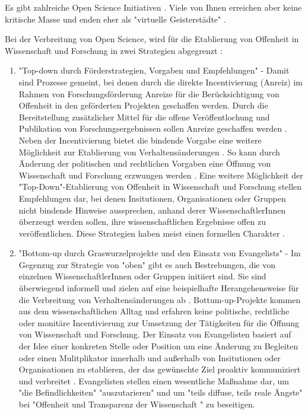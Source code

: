Es gibt zahlreiche Open Science Initiativen \cite{Scheliga_2014}. Viele von Ihnen erreichen aber keine kritische Masse \cite{wrap_2010} und enden eher als "virtuelle Geisterstädte" \cite{Nielsen_2011}.

Bei der Verbreitung von Open Science, wird für die Etablierung von Offenheit in Wissenschaft und Forschung in zwei Strategien abgegrenzt \cite{schulze_2013_open}: 
\begin{enumerate}
\item "Top-down durch Förderstrategien, Vorgaben und Empfehlungen" - 
Damit sind Prozesse gemeint, bei denen durch die direkte Incentivierung (Anreiz) im Rahmen von Forschungsförderung Anreize für die Berücksichtigung von Offenheit in den geförderten Projekten geschaffen werden. Durch die Bereitstellung zusätzlicher Mittel für die offene Veröffentlochung und Publikation von Forschungsergebnissen sollen Anreize geschaffen werden \cite{suchen}. Neben der Incentivierung bietet die bindende Vorgabe eine weitere Möglichkeit zur Etablierung von Verhaltensänderungen \cite{suchen}. So kann durch Änderung der politischen und rechtlichen Vorgaben eine Öffnung von Wissenschaft und Forschung erzwungen werden \cite{suchen}. Eine weitere Möglichkeit der "Top-Down"-Etablierung von Offenheit in Wissenschaft und Forschung stellen Empfehlungen dar, bei denen Insitutionen, Organisationen oder Gruppen nicht bindende Hinweise aussprechen, anhand derer WissenschaftlerInnen überzeugt werden sollen, ihre wissenschaftlichen Ergebnisse offen zu veröffentlichen. Diese Strategien haben meist einen formellen Charakter \cite{suchen}.
\item "Bottom-up durch Graswurzelprojekte und den Einsatz von Evangelists" - 
Im Gegenzug zur Strategie von "oben" gibt es auch Bestrebungen, die von einzelnen WissenschaftlerInnen oder Gruppen initiiert sind. Sie sind überwiegend informell und zielen auf eine beispielhafte Herangehensweise für die Verbreitung von Verhaltensänderungen ab \cite{suchen}. Bottum-up-Projekte kommen aus dem wissenschaftlichen Alltag und erfahren keine politische, rechtliche oder monitäre Incentivierung zur Umsetzung der Tätigkeiten für die Öffnung von Wissenschaft und Forschung. Der Einsatz von Evangelisten basiert auf der Idee einer konkreten Stelle oder Position um eine Änderung zu Begleiten \cite{suchen} oder einen Mulitplikator innerhalb und außerhalb von Insitutionen oder Organisationen zu etablieren, der das gewünschte Ziel proaktiv kommuniziert und verbreitet \cite{suchen}. Evangelisten stellen einen wesentliche Maßnahme dar, um "die Befindlichkeiten" "auszutarieren" und um "teils diffuse, teils reale Ängste" bei "Offenheit und Transparenz der Wissenschaft "\cite{schulze_2013_open} zu beseitigen.
\end{enumerate} 

